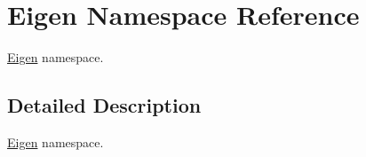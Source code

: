 \hypertarget{namespaceEigen}{\section{Eigen Namespace Reference}
\label{namespaceEigen}
}


\hyperlink{namespaceEigen}{Eigen} namespace.  




\subsection{Detailed Description}
\hyperlink{namespaceEigen}{Eigen} namespace. 